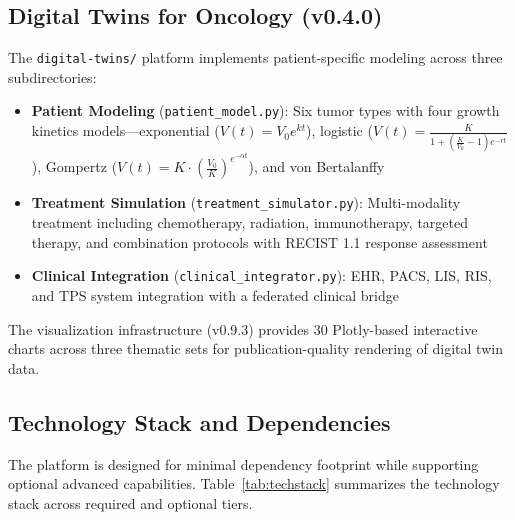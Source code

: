 \subsection{Digital Twins for Oncology (v0.4.0)}

The \texttt{digital-twins/} platform implements patient-specific modeling across three subdirectories:
\begin{itemize}
  \item \textbf{Patient Modeling} (\texttt{patient\_model.py}): Six tumor types with four growth kinetics models---exponential ($V(t) = V_0 e^{kt}$), logistic ($V(t) = \frac{K}{1 + (\frac{K}{V_0} - 1)e^{-rt}}$), Gompertz ($V(t) = K \cdot (\frac{V_0}{K})^{e^{-\alpha t}}$), and von Bertalanffy
  \item \textbf{Treatment Simulation} (\texttt{treatment\_simulator.py}): Multi-modality treatment including chemotherapy, radiation, immunotherapy, targeted therapy, and combination protocols with RECIST 1.1 response assessment~\cite{eisenhauer2009recist}
  \item \textbf{Clinical Integration} (\texttt{clinical\_integrator.py}): EHR, PACS, LIS, RIS, and TPS system integration with a federated clinical bridge
\end{itemize}

The visualization infrastructure (v0.9.3) provides 30 Plotly-based interactive charts across three thematic sets for publication-quality rendering of digital twin data.

\subsection{Technology Stack and Dependencies}

The platform is designed for minimal dependency footprint while supporting optional advanced capabilities. Table~\ref{tab:techstack} summarizes the technology stack across required and optional tiers.

